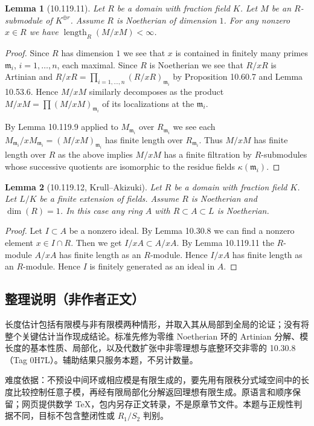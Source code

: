 \documentclass[UTF8,11pt]{ctexart}
\newtheorem*{lemma}{Lemma}
\theoremstyle{definition}
\begin{document}
\begin{lemma}[10.119.11]
Let $R$ be a domain with fraction field $K$. Let $M$ be an $R$-submodule of $K^{\oplus r}$. Assume $R$ is Noetherian of dimension $1$. For any nonzero $x\in R$ we have $\operatorname{length}_R(M/xM)<\infty$.
\end{lemma}
\begin{proof}
Since $R$ has dimension $1$ we see that $x$ is contained in finitely many primes $\mathfrak m_i$, $i=1,\ldots,n$, each maximal. Since $R$ is Noetherian we see that $R/xR$ is Artinian and $R/xR=\prod_{i=1,\ldots,n}(R/xR)_{\mathfrak m_i}$ by Proposition 10.60.7 and Lemma 10.53.6. Hence $M/xM$ similarly decomposes as the product $M/xM=\prod(M/xM)_{\mathfrak m_i}$ of its localizations at the $\mathfrak m_i$.

By Lemma 10.119.9 applied to $M_{\mathfrak m_i}$ over $R_{\mathfrak m_i}$ we see each $M_{\mathfrak m_i}/xM_{\mathfrak m_i}=(M/xM)_{\mathfrak m_i}$ has finite length over $R_{\mathfrak m_i}$. Thus $M/xM$ has finite length over $R$ as the above implies $M/xM$ has a finite filtration by $R$-submodules whose successive quotients are isomorphic to the residue fields $\kappa(\mathfrak m_i)$.
\end{proof}

\begin{lemma}[10.119.12, Krull--Akizuki]
Let $R$ be a domain with fraction field $K$. Let $L/K$ be a finite extension of fields. Assume $R$ is Noetherian and $\dim(R)=1$. In this case any ring $A$ with $R\subset A\subset L$ is Noetherian.
\end{lemma}
\begin{proof}
Let $I\subset A$ be a nonzero ideal. By Lemma 10.30.8 we can find a nonzero element $x\in I\cap R$. Then we get $I/xA\subset A/xA$. By Lemma 10.119.11 the $R$-module $A/xA$ has finite length as an $R$-module. Hence $I/xA$ has finite length as an $R$-module. Hence $I$ is finitely generated as an ideal in $A$.
\end{proof}
\subsection*{整理说明（非作者正文）}
长度估计包括有限模与非有限模两种情形，并取入其从局部到全局的论证；没有将整个关键估计当作现成结论。标准先修为零维 Noetherian 环的 Artinian 分解、模长度的基本性质、局部化，以及代数扩张中非零理想与底整环交非零的 10.30.8（Tag 0H7L）。辅助结果只服务本题，不另计数量。

难度依据：不预设中间环或相应模是有限生成的，要先用有限秩分式域空间中的长度比较控制任意子模，再经有限局部化分解返回理想有限生成。原语言和顺序保留；网页提供数学 TeX，包内另存正文转录，不是原章节文件。本题与正规性判据不同，目标不包含整闭性或 $R_1/S_2$ 判别。
\end{document}
